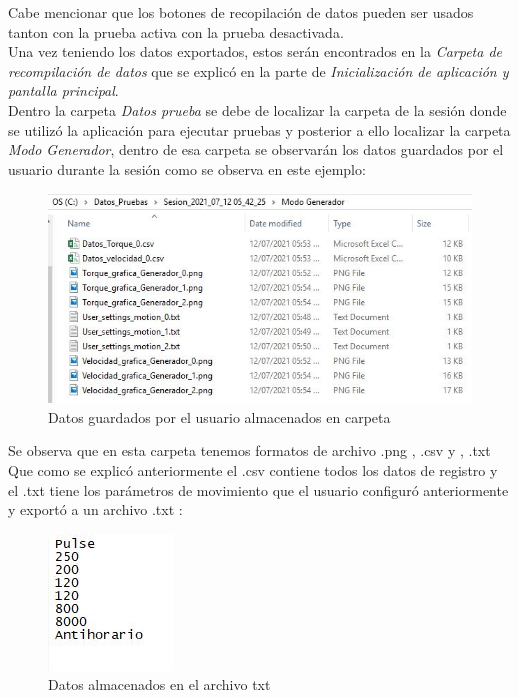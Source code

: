\documentclass[12pt,titlepage]{article}
\begin{document}
Cabe mencionar que los botones de recopilación de datos pueden ser usados tanton con la prueba activa con la prueba desactivada. \\


Una vez teniendo los datos exportados, estos serán encontrados en la \textit{Carpeta de recompilación de datos} que se explicó en la parte de \textit{Inicialización de aplicación y pantalla principal}. \\

Dentro la carpeta \textit{Datos prueba} se debe de localizar la carpeta de la sesión donde se utilizó la aplicación para ejecutar pruebas y posterior a ello  localizar la carpeta \textit{Modo Generador}, dentro de esa carpeta se observarán los datos guardados por el usuario durante la sesión como se observa en este ejemplo: \\ 

\newpage
\begin{figure}[H]
\hspace*{2.3cm} 
\includegraphics[scale=0.77]{datos_gen_mode}
\caption{Datos guardados por el usuario almacenados en carpeta}
\end{figure}

Se observa que en esta carpeta tenemos formatos de archivo .png , .csv y , .txt \\

Que como se explicó anteriormente el .csv contiene todos los datos de registro y el .txt tiene los parámetros de movimiento que el usuario configuró anteriormente y exportó a un archivo .txt : \\

\begin{figure}[H]
\hspace*{6.9cm} 
\includegraphics[scale=1.02]{txt_params}
\caption{Datos almacenados en el archivo txt}
\end{figure}
\end{document}
